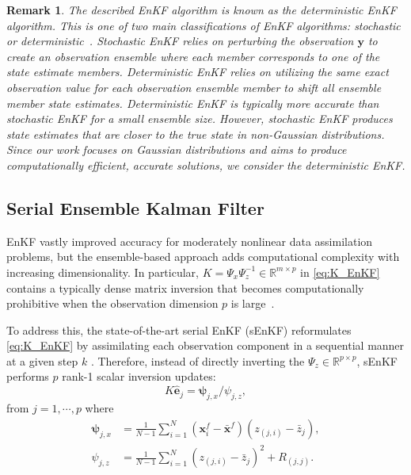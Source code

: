 \documentclass[11p]{elsarticle}
\numberwithin{equation}{section}
\newtheorem{remark}{Remark}
\newcommand{\vect}[1]{\ensuremath{\bm{#1}}}
\begin{document}
\begin{remark}
The described EnKF algorithm is known as the deterministic EnKF algorithm.  This is one of two main classifications of EnKF algorithms: stochastic \cite{Houtemaker1998} or deterministic~\cite{Whitaker2002}.  Stochastic EnKF relies on perturbing the observation $\vect{y}$ to create an observation ensemble where each member corresponds to one of the state estimate members. Deterministic EnKF relies on utilizing the same exact observation value for each observation ensemble member to shift all ensemble member state estimates. Deterministic EnKF is typically more accurate than stochastic EnKF for a small ensemble size.  However, stochastic EnKF produces state estimates that are closer to the true state in non-Gaussian distributions.  Since our work focuses on Gaussian distributions and aims to produce computationally efficient, accurate solutions, we consider the deterministic EnKF.
\end{remark}


\subsection{Serial Ensemble Kalman Filter}
\label{sec:sEnKF}

EnKF vastly improved accuracy for moderately nonlinear data assimilation problems, but the ensemble-based approach adds computational complexity with increasing dimensionality.  In particular,  $ K =\Psi_{x} \Psi_{z}^{-1}  \in \mathbb{R}^{m \times p}$ in \eqref{eq:K_EnKF} contains a typically dense matrix inversion that becomes computationally prohibitive when the observation dimension $p$ is large~\cite{Houtekamer2001}.  

To address this, the state-of-the-art serial EnKF (sEnKF) reformulates \eqref{eq:K_EnKF} by assimilating each observation component in a sequential manner at a given step $k$ \cite{Houtekamer2001}.  Therefore, instead of directly inverting the $\Psi_{z} \in \mathbb{R}^{p \times p}$, sEnKF performs $p$ rank-1 scalar inversion updates:
\begin{equation}
    K\hat{\vect{e}}_j = \vect{\psi}_{j,x} /  \psi_{j,z},
\end{equation}
from $j=1, \cdots, p$ where
\begin{align}
    \vect{\psi}_{j,x} &= \frac{1}{N-1} \sum_{i=1}^{N} (\vect{x}_{i}^f - \vect{\bar{x}}^f)(z_{(j,i)} - \bar{z}_{j}), \\
    \psi_{j,z} &= \frac{1}{N-1} \sum_{i=1}^{N} (z_{(j,i)} - \bar{z}_{j})^2 + R_{(j,j)}.
    \label{Obs_Cov_sEnKF}
\end{align}
\end{document}
